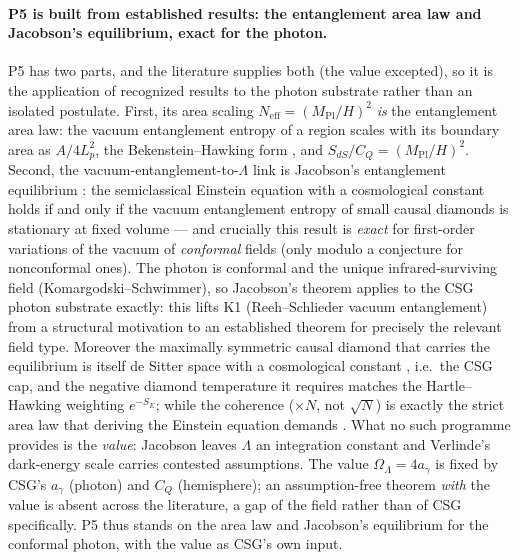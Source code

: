 \documentclass[11pt,a4paper]{article}
\theoremstyle{plain}
\theoremstyle{definition}
\theoremstyle{remark}
\newcommand{\OL}{\Omega_\Lambda}
\newcommand{\ag}{a_\gamma}
\newcommand{\CQ}{C_Q}
\newcommand{\Mpl}{M_{\mathrm{Pl}}}
\begin{document}
\paragraph{P5 is built from established results: the entanglement area law and Jacobson's
equilibrium, exact for the photon.} P5 has two parts, and the literature supplies both (the value
excepted), so it is the application of recognized results to the photon substrate rather than an
isolated postulate. First, its area scaling $N_{\mathrm{eff}}=(\Mpl/H)^2$ \emph{is} the entanglement
area law: the vacuum entanglement entropy of a region scales with its boundary area as $A/4L_p^2$,
the Bekenstein--Hawking form \cite{Jacobson2016,RyuTakayanagi2006}, and $S_{dS}/\CQ=(\Mpl/H)^2$.
Second, the vacuum-entanglement-to-$\Lambda$ link is Jacobson's entanglement equilibrium
\cite{Jacobson2016}: the semiclassical Einstein equation with a cosmological constant holds if and
only if the vacuum entanglement entropy of small causal diamonds is stationary at fixed volume ---
and crucially this result is \emph{exact} for first-order variations of the vacuum of \emph{conformal}
fields (only modulo a conjecture for nonconformal ones). The photon is conformal and the unique
infrared-surviving field (Komargodski--Schwimmer), so Jacobson's theorem applies to the CSG photon
substrate exactly: this lifts K1 (Reeh--Schlieder vacuum entanglement) from a structural motivation
to an established theorem for precisely the relevant field type. Moreover the maximally symmetric
causal diamond that carries the equilibrium is itself de Sitter space with a cosmological constant
\cite{JacobsonVisser2019}, i.e.\ the CSG cap, and the negative diamond temperature it requires
matches the Hartle--Hawking weighting $e^{-S_E}$; while the coherence ($\times N$, not $\sqrt N$) is
exactly the strict area law that deriving the Einstein equation demands \cite{Verlinde2017}. What no
such programme provides is the \emph{value}: Jacobson leaves $\Lambda$ an integration constant and
Verlinde's dark-energy scale carries contested assumptions. The value $\OL=4\ag$ is fixed by CSG's
$\ag$ (photon) and $\CQ$ (hemisphere); an assumption-free theorem \emph{with} the value is absent
across the literature, a gap of the field rather than of CSG specifically. P5 thus stands on the
area law and Jacobson's equilibrium for the conformal photon, with the value as CSG's own input.
\end{document}
